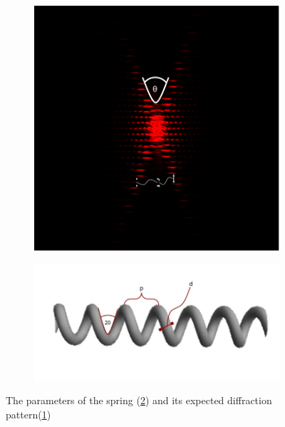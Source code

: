 \begin{figure}[H]
    \centering
    \begin{subfigure}{0.48\columnwidth}
        \centering
        \includegraphics[width=\columnwidth]{figures/interference pattern.png} %
        \label{fig:expansion interference simulation}
    \end{subfigure}
    \begin{subfigure}{0.48\columnwidth}
        \centering
        \includegraphics[width=\columnwidth]{figures/spring parameters illustration.jpg}
        \label{fig:spring parameters illustration}
    \end{subfigure}
    \caption{The parameters of the spring (\ref{fig:spring parameters illustration}) and its expected diffraction pattern(\ref{fig:expansion interference simulation})}
    \label{fig:expansion theory illustrations}
\end{figure}

